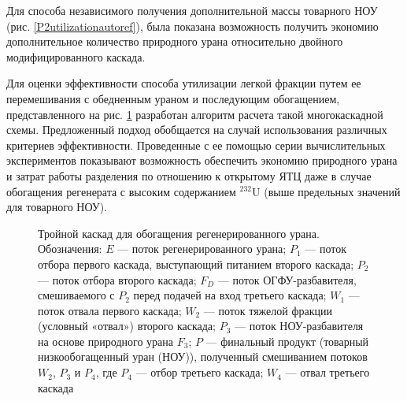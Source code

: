 Для способа независимого получения дополнительной массы товарного НОУ (рис. \ref{P2utilizationautoref}), была показана возможность получить экономию дополнительное количество природного урана относительно двойного модифицированного каскада.

Для оценки эффективности способа утилизации легкой фракции путем ее перемешивания с обедненным ураном и последующим обогащением, представленного на рис. \ref{p2_withDepU} разработан алгоритм расчета такой многокаскадной схемы. Предложенный подход обобщается на случай использования различных критериев эффективности. Проведенные с ее помощью серии вычислительных экспериментов показывают возможность обеспечить экономию природного урана и затрат работы разделения по отношению к открытому ЯТЦ даже в случае обогащения регенерата с высоким содержанием $^{232}$U (выше предельных значений для товарного НОУ).

\begin{figure}[ht]
  \caption{Тройной каскад для обогащения регенерированного урана. Обозначения: $E$ --- поток регенерированного урана; $P_1$ --- поток отбора первого каскада, выступающий питанием второго каскада; $P_2$ --- поток отбора второго каскада; $F_{D}$ --- поток ОГФУ-разбавителя, смешиваемого с $P_2$ перед подачей на вход третьего каскада; $W_1$ --- поток отвала первого каскада; $W_2$ --- поток тяжелой фракции (условный «отвал») второго каскада; $P_3$ --- поток НОУ-разбавителя на основе природного урана $F_3$; $P$ --- финальный продукт (товарный низкообогащенный уран (НОУ)), полученный смешиванием потоков $W_2$, $P_3$ и $P_4$, где $P_4$ --- отбор третьего каскада; $W_4$ --- отвал третьего каскада}\label{p2_withDepU}
\end{figure}

